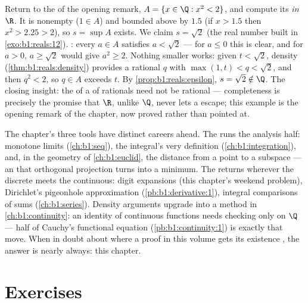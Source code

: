 \begin{example}\label{ex:b1:reals:supescape}
Return to the  of the opening remark, $A = \{x \in \Q : x^2 <
2\}$, and compute its  \emph{in $\R$}. It is nonempty
($1 \in A$) and bounded above by $1.5$ (if $x > 1.5$ then $x^2 >
2.25 > 2$), so $s = \sup A$ exists. We claim $s = \sqrt 2$ (the
real number built in \cref{exo:b1:reals:12}). : every
$a \in A$ satisfies $a < \sqrt2$ --- for $a \leq 0$ this is
clear, and for $a > 0$, $a \geq \sqrt2$ would give $a^2 \geq 2$.
Nothing smaller works: given $t < \sqrt2$, density
(\cref{thm:b1:reals:density}) provides a rational $q$ with
$\max(1, t) < q < \sqrt 2$, and then $q^2 < 2$, so $q \in A$
exceeds $t$. By \cref{prop:b1:reals:epsilon}, $s = \sqrt2
\notin \Q$. The closing insight: the  of a  of
rationals need not be rational --- completeness is precisely the
promise that $\R$, unlike $\Q$, never lets a  escape;
this example is the opening remark of the chapter, now proved
rather than pointed at.
\end{example}

\begin{remark}
The chapter's three tools have distinct careers ahead. The
 runs the analysis half: monotone limits
(\cref{ch:b1:seq}), the integral's very definition
(\cref{ch:b1:integration}), and, in the geometry of
\cref{ch:b1:euclid}, the distance from a point to a subspace ---
an  that orthogonal projection turns into a minimum. The
 returns wherever the discrete meets the
continuous: digit expansions (this chapter's weekend problem),
Dirichlet's pigeonhole approximation
(\cref{pb:b1:derivative:1}), integral comparisons of sums
(\cref{ch:b1:series}). Density arguments upgrade into a method
in \cref{ch:b1:continuity}: an identity of continuous functions
needs checking only on $\Q$ --- half of Cauchy's functional
equation (\cref{pb:b1:continuity:1}) is exactly that move. When
in doubt about where a proof in this volume gets its existence
, the answer is nearly always: this chapter.
\end{remark}

\section{Exercises}

